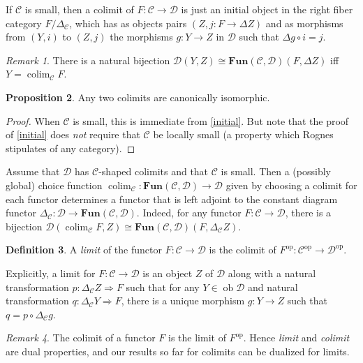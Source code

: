 \documentclass[10pt,letterpaper,cm]{nupset}
\theoremstyle{definition}
\newtheorem{definition}{Definition}[section]
\theoremstyle{theorem}
\newtheorem{prop}[definition]{Proposition}
\theoremstyle{remark}
\newtheorem{remark}[definition]{Remark}
\newcommand{\1}{\mathbf{1}}
\renewcommand{\c}{\mathscr{C}}
\renewcommand{\d}{\mathscr{D}}
\newcommand{\0}{\vec 0}
\DeclareMathOperator{\op}{op}
\DeclareMathOperator{\ob}{ob}
\DeclareMathOperator{\colim}{colim}
\begin{document}
If $\c$ is small, then a colimit of $F: \c \to \d$ is just an initial object in the right fiber category $F/\Delta_{\c}$, which has as objects pairs $\left(Z, j: F \to \Delta{Z}\right)$ and as morphisms from $(Y, i)$ to $(Z, j)$ the morphisms $g : Y \to Z$ in $\d$ such that $\Delta{g} \circ i = j$.

\smallskip

\begin{remark}
There is a natural bijection $\d(Y, Z) \cong \mathbf{Fun}(\c, \d)(F, \Delta{Z})$ iff $Y = \colim_{\c}F$.
\end{remark}

\begin{prop}
Any two colimits are canonically isomorphic.
\end{prop}
\begin{proof}
When $\c$ is small, this is immediate from \cref{initial}. But note that the proof of \cref{initial} does \emph{not} require that $\c$ be locally small (a property which Rognes stipulates of any category). 
\end{proof}

\smallskip

Assume that $\d$ has $\c$-shaped colimits and that $\c$ is small. Then a (possibly global) choice function $\colim_\c : \mathbf{Fun}(\c, \d) \to \d$ given by choosing a colimit for each functor determines a functor that is left adjoint to the constant diagram functor $\Delta_{\c} : \d \to \mathbf{Fun}(\c, \d)$. Indeed,
for any functor $F : \c \to \d$, there is a bijection $\d(\colim_{\c} F, Z) \cong \mathbf{Fun}(\c, \d)(F, \Delta_{\c}Z)$.

\begin{definition}
A \textit{limit} of the functor $F: \c \to \d$ is  the colimit of $F^{\op} : \c^{\op} \to \d^{\op}$.
\end{definition}


Explicitly,  a limit for $F: \c \to \d$ is an object $Z$ of $\d$ along with a natural transformation $p: \Delta_{\c}Z \Rightarrow F$ such that for any $Y \in \ob \d$ and natural transformation $q: \Delta_{\c}Y \Rightarrow F$, there is a unique morphism $g: Y \to Z$ such that $ q= p \circ \Delta_{\c}g$.


\begin{remark}
The colimit of a functor $F$ is the limit of $F^{\op}$. Hence \textit{limit} and \textit{colimit} are dual properties, and our results so far for colimits can be dualized  for limits.
\end{remark}
\end{document}
